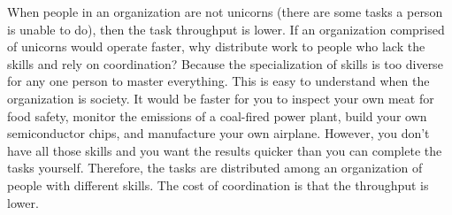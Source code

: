 When people in an organization are not unicorns (there are some tasks a person is unable to do), then the task throughput is lower. If an organization comprised of unicorns would operate faster, why distribute work to people who lack the skills and rely on coordination?
Because the specialization of skills is too diverse for any one person to master everything. This is easy to understand when the organization is society. It would be faster for you to 
 inspect your own meat for food safety, monitor the emissions of a coal-fired power plant, build your own semiconductor chips, and manufacture your own airplane. However, you don't have all those skills and you want the results quicker than you can complete the tasks yourself. Therefore, the tasks are distributed among an organization of people with different skills. The cost of coordination is that the throughput is lower.













